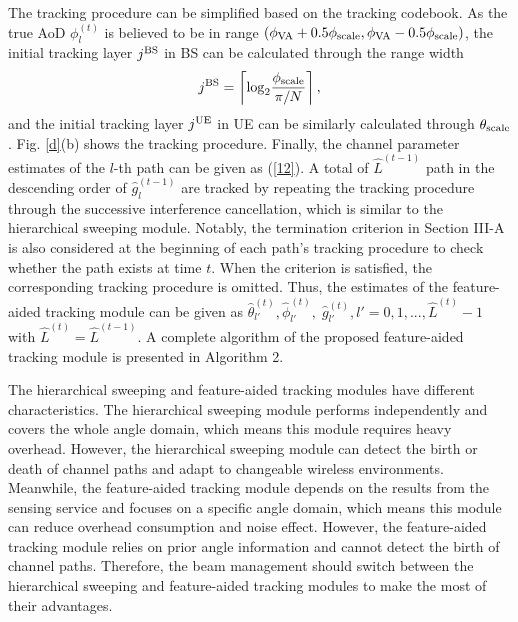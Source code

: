 \documentclass[journal,12pt,onecolumn,draftclsnofoot,]{IEEEtran}
\begin{document}
The tracking procedure can be simplified based on the tracking codebook. As the true AoD $\phi_{l}^{(t)}$ is believed to be in range $( \phi_{\rm VA}+ 0.5{\phi _{{\rm{scale}}}},\phi_{\rm VA}-0.5{\phi _{{\rm{scale}}}} )$, the initial tracking layer ${j^{\rm BS}}$ in BS can be calculated through the range width 
\begin{equation}\label{22}
{j^{\rm BS}} = \left\lceil{{{\log }_2}\frac{{{\phi _{\rm scale}}}}{{{\rm{\pi }}/N}}}\right\rceil,
\end{equation}
and the initial tracking layer ${j^{\rm UE}}$ in UE can be similarly calculated through $\theta _{{\rm{scale}}}$. 
Fig. \ref{d}(b) shows the tracking procedure. Finally, the channel parameter estimates of the $l$-th path can be given as (\ref{12}).
A total of ${\hat L}^{({t - 1} )}$ path in the descending order of $\hat g_l^{({t - 1} )}$ are tracked by repeating the tracking procedure through the successive interference cancellation, which is similar to the hierarchical sweeping module. 
Notably, the termination criterion in Section III-A is also considered at the beginning of each path's tracking procedure to check whether the path exists at time $t$. 
When the criterion is satisfied, the corresponding tracking procedure is omitted. 
Thus, the estimates of the feature-aided tracking module can be given as $\hat \theta _{l'}^{(t )},\hat \phi _{l'}^{(t )},\;\hat g_{l'}^{(t )},{l'} = 0,1, ...,{\hat L}^{(t )} - 1$ with ${{\hat L}^{({t} )}}={\hat L}^{({t - 1} )}$. 
{\color{black}A complete algorithm of the proposed feature-aided tracking module is presented in Algorithm 2.} 

The hierarchical sweeping and feature-aided tracking modules have different characteristics. 
The hierarchical sweeping module performs independently and covers the whole angle domain, which means this module requires heavy overhead. 
However, the hierarchical sweeping module can detect the birth or death of channel paths and adapt to changeable wireless environments.
Meanwhile, the feature-aided tracking module depends on the results from the sensing service and focuses on a specific angle domain, which means this module can reduce overhead consumption and noise effect. 
However, the feature-aided tracking module relies on prior angle information and cannot detect the birth of channel paths.
Therefore, the beam management should switch between the hierarchical sweeping and feature-aided tracking modules to make the most of their advantages.
\end{document}
